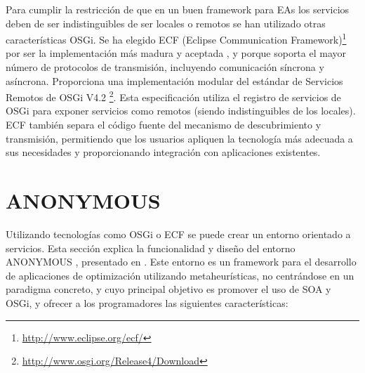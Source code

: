 \documentclass[runningheads]{llncs}
\begin{document}
Para cumplir la restricción de que en un buen framework para EAs los servicios deben de ser indistinguibles de ser locales o remotos se han utilizado otras características OSGi.  Se ha elegido ECF (Eclipse Communication Framework)\footnote{\url{http://www.eclipse.org/ecf/}} por ser la implementación más madura y aceptada \cite{petzold2011dynamic}, y porque soporta el mayor número de protocolos de transmisión, incluyendo comunicación síncrona y asíncrona. Proporciona una implementación modular del estándar de Servicios Remotos de OSGi V4.2 \footnote{\url{http://www.osgi.org/Release4/Download}}. Esta especificación utiliza el registro de servicios de OSGi para exponer servicios como remotos (siendo indistinguibles de los locales). ECF también separa el código fuente del mecanismo de descubrimiento y transmisión, permitiendo que los usuarios apliquen la tecnología más adecuada a sus necesidades y proporcionando integración con aplicaciones existentes.


\section{ANONYMOUS}
\label{sec:osgiliath}
Utilizando tecnologías como OSGi o ECF se puede crear un entorno orientado a servicios. Esta sección explica la funcionalidad y diseño del entorno ANONYMOUS %
, presentado en \cite{OSGILIATHNICSO}. Este entorno es un framework para el desarrollo de aplicaciones de optimización utilizando metaheurísticas, no centrándose en un paradigma concreto, y cuyo principal objetivo es promover el uso de SOA y OSGi, y ofrecer a los programadores las siguientes características:
\end{document}
